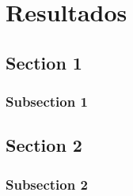 \chapter{Resultados}
\label{ch3}

\section{Section 1}
    \subsection{Subsection 1}

\section{Section 2}
    \subsection{Subsection 2}